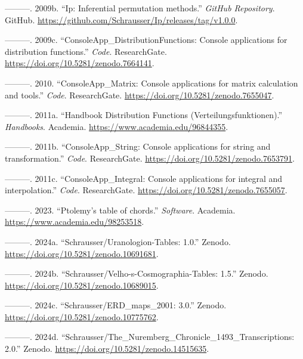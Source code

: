 \documentclass[
]{article}
\newlength{\cslhangindent}
\newlength{\cslentryspacingunit} %
\newenvironment{CSLReferences}[2] %
 {%
  \setlength{\parindent}{0pt}
  \ifodd #1
  \let\oldpar\par
  \def\par{\hangindent=\cslhangindent\oldpar}
  \fi
  \setlength{\parskip}{#2\cslentryspacingunit}
 }%
 {}
\begin{document}
\begin{CSLReferences}{1}{0}
\leavevmode{}%
---------. 2009b. {``{Ip: Inferential permutation methods}.''}
\emph{GitHub Repository}. GitHub.
\url{https://github.com/Schrausser/Ip/releases/tag/v1.0.0}.

\leavevmode{}%
---------. 2009c. {``{ConsoleApp\_DistributionFunctions: Console
applications for distribution functions}.''} \emph{Code}. ResearchGate.
\url{https://doi.org/10.5281/zenodo.7664141}.

\leavevmode{}%
---------. 2010. {``{ConsoleApp\_Matrix: Console applications for matrix
calculation and tools}.''} \emph{Code}. ResearchGate.
\url{https://doi.org/10.5281/zenodo.7655047}.

\leavevmode{}%
---------. 2011a. {``{Handbook Distribution Functions
(Verteilungsfunktionen)}.''} \emph{Handbooks}. Academia.
\url{https://www.academia.edu/96844355}.

\leavevmode{}%
---------. 2011b. {``{ConsoleApp\_String: Console applications for
string and transformation}.''} \emph{Code}. ResearchGate.
\url{https://doi.org/10.5281/zenodo.7653791}.

\leavevmode{}%
---------. 2011c. {``{ConsoleApp\_Integral: Console applications for
integral and interpolation}.''} \emph{Code}. ResearchGate.
\url{https://doi.org/10.5281/zenodo.7655057}.

\leavevmode{}%
---------. 2023. {``{Ptolemy's table of chords}.''} \emph{Software}.
Academia. \url{https://www.academia.edu/98253518}.

\leavevmode{}%
---------. 2024a. {``Schrausser/Uranologion-Tables: 1.0.''} Zenodo.
\url{https://doi.org/10.5281/zenodo.10691681}.

\leavevmode{}%
---------. 2024b. {``Schrausser/Velho-s-Cosmographia-Tables: 1.5.''}
Zenodo. \url{https://doi.org/10.5281/zenodo.10689015}.

\leavevmode{}%
---------. 2024c. {``Schrausser/ERD\_maps\_2001: 3.0.''} Zenodo.
\url{https://doi.org/10.5281/zenodo.10775762}.

\leavevmode{}%
---------. 2024d.
{``{Schrausser/The\_Nuremberg\_Chronicle\_1493\_Transcriptions: 2.0}.''}
Zenodo. \url{https://doi.org/10.5281/zenodo.14515635}.


\end{CSLReferences}
\end{document}
